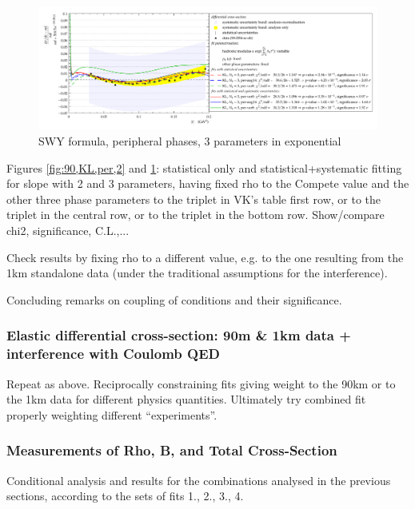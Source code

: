 \begin{figure}
\begin{center}
\includegraphics[width=18cm]{simone/90/KL,per-var048,3,stat-stat+syst.pdf}
\vskip-3mm
\caption{SWY formula, peripheral phases, 3 parameters in exponential}
\label{fig:90,KL,per,3}
\end{center}
\end{figure}
\fi

Figures \ref{fig:90,KL,per,2} and \ref{fig:90,KL,per,3}:
statistical only and statistical+systematic fitting for slope with 2 and 3 parameters,
having fixed rho to the Compete value and the other three phase parameters to the triplet
in VK’s table first row, or to the triplet in the central row, or to the triplet in the
bottom row. Show/compare chi2, significance, C.L.,...

Check results by fixing rho to a different value, e.g. to the one resulting from the 1km
standalone data (under the traditional assumptions for the interference).

Concluding remarks on coupling of conditions and their significance.


\subsubsection{Elastic differential cross-section: 90m \& 1km data + interference with Coulomb QED}

Repeat as above. Reciprocally constraining fits giving weight to the 90km or to the 1km data
for different physics quantities. Ultimately try combined fit properly weighting different
“experiments”.


\subsubsection{Measurements of Rho, B, and Total Cross-Section}

Conditional analysis and results for the combinations analysed in the previous sections,
according to the sets of fits 1., 2., 3., 4.
